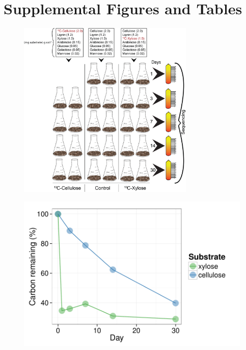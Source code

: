 
\section{Supplemental Figures and Tables}

\begin{figure}[H]
	\begin{center}
	\centerline{\includegraphics[width=0.75\textwidth]{figures/20150320methods_conceptual/20150320methods_conceptual.png}}
	\caption[Experimental Set Up]{\protect}\label{fig:setup}
        \end{center}
\end{figure}

\begin{figure}[H]
	\begin{center}
	\centerline{\includegraphics[width=11.4cm]{figures/13C_chart/13C_chart.pdf}}
	\caption{\protect}\label{fig:13C}
        \end{center}
\end{figure}


